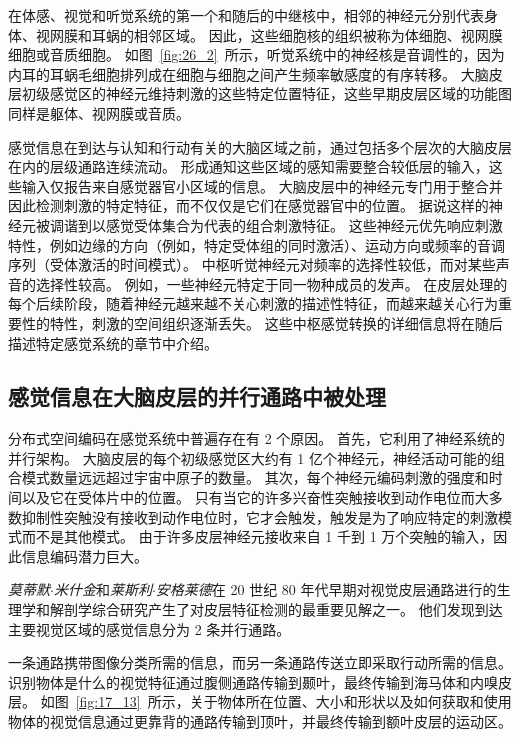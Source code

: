 在体感、视觉和听觉系统的第一个和随后的中继核中，相邻的神经元分别代表身体、视网膜和耳蜗的相邻区域。 
因此，这些细胞核的组织被称为体细胞、视网膜细胞或音质细胞。 
如图~\ref{fig:26_2}~所示，听觉系统中的神经核是音调性的，因为内耳的耳蜗毛细胞排列成在细胞与细胞之间产生频率敏感度的有序转移。
大脑皮层初级感觉区的神经元维持刺激的这些特定位置特征，这些早期皮层区域的功能图同样是躯体、视网膜或音质。


感觉信息在到达与认知和行动有关的大脑区域之前，通过包括多个层次的大脑皮层在内的层级通路连续流动。
形成通知这些区域的感知需要整合较低层的输入，这些输入仅报告来自感觉器官小区域的信息。
大脑皮层中的神经元专门用于整合并因此检测刺激的特定特征，而不仅仅是它们在感觉器官中的位置。
据说这样的神经元被调谐到以感觉受体集合为代表的组合刺激特征。
这些神经元优先响应刺激特性，例如边缘的方向（例如，特定受体组的同时激活）、运动方向或频率的音调序列（受体激活的时间模式）。
中枢听觉神经元对频率的选择性较低，而对某些声音的选择性较高。
例如，一些神经元特定于同一物种成员的发声。
在皮层处理的每个后续阶段，随着神经元越来越不关心刺激的描述性特征，而越来越关心行为重要性的特性，刺激的空间组织逐渐丢失。
这些中枢感觉转换的详细信息将在随后描述特定感觉系统的章节中介绍。



\subsection{感觉信息在大脑皮层的并行通路中被处理}

分布式空间编码在感觉系统中普遍存在有 2 个原因。
首先，它利用了神经系统的并行架构。
大脑皮层的每个初级感觉区大约有 1 亿个神经元，神经活动可能的组合模式数量远远超过宇宙中原子的数量。
其次，每个神经元编码刺激的强度和时间以及它在受体片中的位置。
只有当它的许多兴奋性突触接收到动作电位而大多数抑制性突触没有接收到动作电位时，它才会触发，触发是为了响应特定的刺激模式而不是其他模式。
由于许多皮层神经元接收来自 1 千到 1 万个突触的输入，因此信息编码潜力巨大。


\textit{莫蒂默$\cdot$米什金}和\textit{莱斯利$\cdot$安格莱德}在 20 世纪 80 年代早期对视觉皮层通路进行的生理学和解剖学综合研究产生了对皮层特征检测的最重要见解之一\cite{goodale2013two}。
他们发现到达主要视觉区域的感觉信息分为 2 条并行通路。


一条通路携带图像分类所需的信息，而另一条通路传送立即采取行动所需的信息。
识别物体是什么的视觉特征通过腹侧通路传输到颞叶，最终传输到海马体和内嗅皮层。 
如图~\ref{fig:17_13}~所示，关于物体所在位置、大小和形状以及如何获取和使用物体的视觉信息通过更靠背的通路传输到顶叶，并最终传输到额叶皮层的运动区。


